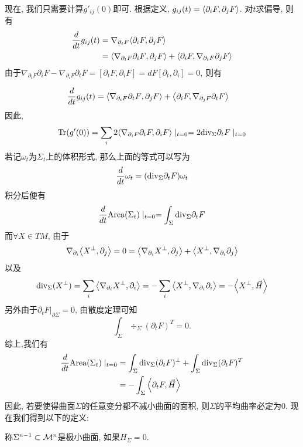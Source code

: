 现在, 我们只需要计算$g'_{ij}(0)$即可. 根据定义, $g_{ij}(t)={\left < \partial_iF, \partial_jF \right >}$. 对$t$求偏导, 则有
\begin{equation}
    \begin{split}
        \frac{d}{dt} g_{ij}(t)& =\nabla_{\partial_t F}{\left < \partial_iF, \partial_jF \right >} \\
                    & ={\left < \nabla_{\partial_t F}{\partial_iF}, \partial_jF \right >}+ {\left < \partial_iF, \nabla_{\partial_tF}\partial_jF \right >}
    \end{split}
\end{equation}
由于$\nabla_{\partial_tF}\partial_iF - \nabla_{\partial_iF} \partial_tF=[\partial_tF,\partial_iF]=dF[\partial_t,\partial_i]=0$, 则有

\begin{equation}
    \begin{split}
        \frac{d}{dt} g_{ij}(t) & ={\left < \nabla_{\partial_i F}{\partial_tF}, \partial_jF \right >}+ {\left < \partial_iF, \nabla_{\partial_jF}\partial_tF \right >}
    \end{split}
\end{equation}
因此,
\begin{equation}
    {\text{Tr}}(g'(0))=\sum_i 2{\left < \nabla_{\partial_iF}\partial_tF, \partial_iF \right >} \mid_{t=0}=2{\text{div}}_\Sigma \partial_tF\mid_{t=0}
\end{equation}
若记$\omega_t$为$\Sigma_t$上的体积形式, 那么上面的等式可以写为
\begin{equation} \label{first_variation_local}
    \frac{d}{dt} \omega_t =({\text{div}}_\Sigma \partial_t F)\omega_t
\end{equation}
积分后便有
\begin{equation}
    \frac{d}{dt} \text{Area}(\Sigma_t)\mid_{t=0}=\int_\Sigma {\text{div}}_\Sigma \partial_t F
\end{equation}
而$\forall X \in TM$, 由于
\begin{equation}
    \nabla_{\partial_i}{\left < X^\perp, \partial_j \right >}=0={\left < \nabla_{\partial_i}X^\perp, \partial_j \right >}+{\left < X^\perp, \nabla_{\partial_i}\partial_j \right >}
\end{equation}
以及 
\begin{equation}
    {\text{div}}_\Sigma(X^\perp)=\sum_i{\left < \nabla_{\partial_i}X^\perp, \partial_i \right >}=-\sum_i{\left < X^\perp, \nabla_{\partial_i}\partial_i \right >}=-{\left < X^\perp, \vec{H} \right >}
\end{equation}
另外由于$\partial_tF|_{\partial \Sigma}=0$, 由散度定理可知
\begin{equation}
        \int_\Sigma \div_{\Sigma}(\partial_tF)^T =0.
\end{equation}
综上,我们有
\begin{equation}
    \begin{split}
        \frac{d}{dt} \text{Area}(\Sigma_t)\mid_{t=0} & = \int_\Sigma {\text{div}}_{\Sigma}(\partial_tF)^\perp + \int_\Sigma {\text{div}}_{\Sigma}(\partial_tF)^T \\
        &=-\int_\Sigma{\left < \partial_tF, \vec{H} \right >}
    \end{split}
\end{equation}
因此, 若要使得曲面$\Sigma$的任意变分都不减小曲面的面积, 则$\Sigma$的平均曲率必定为0. 现在我们得到以下的定义:
\begin{definition}
    称$\Sigma^{n-1} \subset {\mathcal{M}}^n$是极小曲面, 如果$H_\Sigma=0$.
\end{definition}
